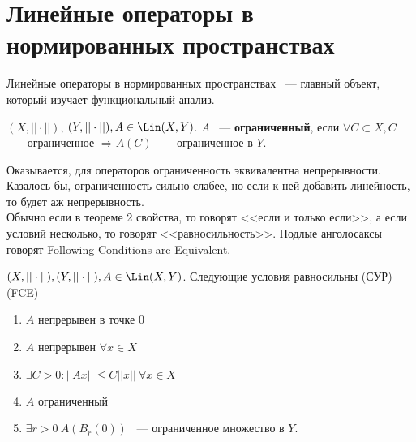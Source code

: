 \documentclass[document]{subfiles}
\begin{document}
\section{Линейные операторы в нормированных пространствах}
Линейные операторы в нормированных пространствах ~--- главный объект, который изучает функциональный анализ.
\begin{definition}
    $(X, || \cdot||)$, $(Y, || \cdot ||), A \in \Lin(X,Y) $. $A$ ~--- \textbf{ ограниченный}, если $\forall C \subset X, C$ ~--- ограниченное $\Rightarrow A(C)$ ~--- ограниченное 
    в $Y$.
\end{definition}
Оказывается, для операторов ограниченность эквивалентна непрерывности. Казалось бы, ограниченность сильно слабее, но если к ней добавить  линейность, то будет аж непрерывность. \\
Обычно если в теореме 2 свойства, то говорят <<если и только если>>, а если условий несколько, то говорят <<равносильность>>. Подлые анголосаксы говорят Following Conditions are Equivalent.
 
\begin{theorem}
    $(X, ||\cdot||), (Y, ||\cdot||), A \in \Lin(X,Y)$. Следующие условия равносильны (СУР) (FCE)
    \begin{enumerate}
        \item $A$ непрерывен в точке $0$ 
        \item $A$ непрерывен $\forall x \in X$  %
        \item $\exists C > 0 : ||Ax|| \leq C||x|| \: \forall x \in X $
        \item $A$ ограниченный
        \item $\exists r > 0 \: A(B_r(0))$ ~--- ограниченное множество в $Y$.
    \end{enumerate}
\end{theorem}
 
\end{document}
